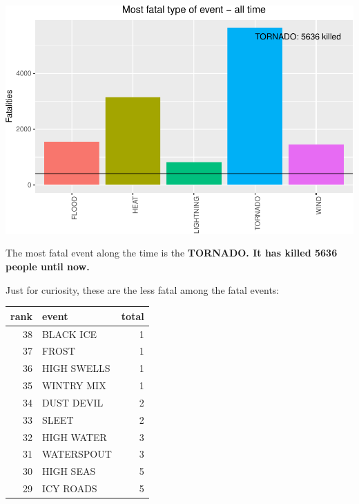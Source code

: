 \documentclass[]{article}
\newenvironment{Shaded}{\begin{snugshade}}{\end{snugshade}}
\newcommand{\KeywordTok}[1]{\textcolor[rgb]{0.13,0.29,0.53}{\textbf{{#1}}}}
\newcommand{\DataTypeTok}[1]{\textcolor[rgb]{0.13,0.29,0.53}{{#1}}}
\newcommand{\DecValTok}[1]{\textcolor[rgb]{0.00,0.00,0.81}{{#1}}}
\newcommand{\StringTok}[1]{\textcolor[rgb]{0.31,0.60,0.02}{{#1}}}
\newcommand{\CommentTok}[1]{\textcolor[rgb]{0.56,0.35,0.01}{\textit{{#1}}}}
\newcommand{\NormalTok}[1]{{#1}}
\begin{document}
\includegraphics{readme_files/figure-latex/fatal-plot-alltime-1.pdf}

The most fatal event along the time is the \textbf{TORNADO. It has
killed 5636 people until now.}

Just for curiosity, these are the less fatal among the fatal events:

\begin{Shaded}
\end{Shaded}

\begin{longtable}[]{@{}rlr@{}}
\toprule
rank & event & total\tabularnewline
\midrule
\endhead
38 & BLACK ICE & 1\tabularnewline
37 & FROST & 1\tabularnewline
36 & HIGH SWELLS & 1\tabularnewline
35 & WINTRY MIX & 1\tabularnewline
34 & DUST DEVIL & 2\tabularnewline
33 & SLEET & 2\tabularnewline
32 & HIGH WATER & 3\tabularnewline
31 & WATERSPOUT & 3\tabularnewline
30 & HIGH SEAS & 5\tabularnewline
29 & ICY ROADS & 5\tabularnewline
\bottomrule
\end{longtable}
\end{document}
